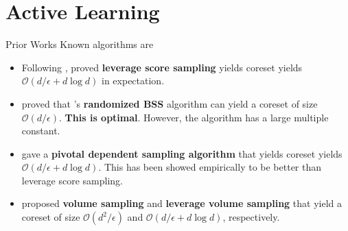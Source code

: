 \documentclass{beamer}
\begin{document}




\section{Active Learning}

\begin{frame}{Prior Works}
    Known algorithms are
    \begin{itemize}
        \item Following \citep{drineas2008}, \citet{pmlr-v99-chen19a} proved \textbf{leverage score sampling} yields coreset yields $\mathcal{O}(d/\epsilon + d\log d)$ in expectation.  
        \vfill
        \item \citet{pmlr-v99-chen19a} proved that \citep{yintatlee2015}'s \textbf{randomized BSS} algorithm can yield a coreset of size $\mathcal{O}(d/\epsilon)$. \textbf{This is optimal}. However, the algorithm has a large multiple constant. 
        \vfill
        \item \citet{shimizu2024improved} gave a \textbf{pivotal dependent sampling algorithm} that yields coreset yields $\mathcal{O}(d/\epsilon + d\log d)$. This has been showed empirically to be better than leverage score sampling.
        \vfill
        \item \citep{derenski2017,derenski2018} proposed \textbf{volume sampling} and \textbf{leverage volume sampling} that yield a coreset of size $\mathcal{O}(d^2 / \epsilon)$ and $\mathcal{O}(d / \epsilon + d\log d)$, respectively.
    \end{itemize}

\end{frame}
\end{document}
